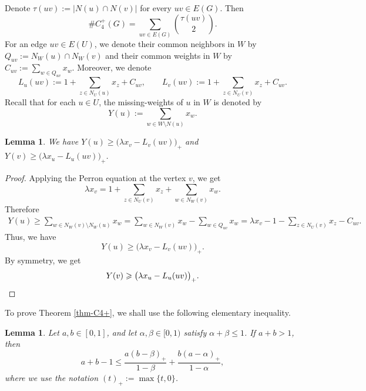\documentclass[10pt,a4paper]{amsart}
\newtheorem{lemma}[theorem]{Lemma}
\renewcommand{\le}{\leqslant}
\renewcommand{\ge}{\geqslant}
\begin{document}
\smallskip 
Denote $  \tau(uv):=|N(u)\cap N(v)|$ for every  $uv\in E(G)$. 
Then
\begin{equation}\label{eq:kite-book-count}
        \texttt{\#}{C_4^+}(G)=\sum_{uv\in E(G)}{\tau(uv)\choose 2}.
\end{equation}  
For an edge \(uv\in E(U)\), we denote their  common neighbors in $W$ by 
$ Q_{uv}:=N_W(u)\cap N_W(v)$ 
and their common weights in $W$ by 
$C_{uv}:=\sum_{w\in Q_{uv}}x_w$. 
Moreover, we denote 
\[
        L_u(uv):=1+\sum_{z\in N_U(u)}x_z +C_{uv},
        \qquad
        L_v(uv):=1+ \sum_{z\in N_U(v)}x_z +C_{uv}.
\]
Recall that for each $u\in U$, the missing-weights of $u$ in $W$ is denoted by 
$$ Y(u) :=\sum_{w\in W\setminus N(u)}x_w. $$ 

\begin{lemma} \label{lem:Yu-Yv-lower-weighted}
    We have $Y(u)\ge \bigl(\lambda x_v-L_v(uv)\bigr)_+$ and $Y(v)\ge \bigl(\lambda x_u-L_u(uv)\bigr)_+$. 
\end{lemma}

\begin{proof} 
Applying the Perron equation at the vertex \(v\), we get
\[
        \lambda x_v
        =
        1+\sum_{z\in N_U(v)}x_z+\sum_{w\in N_W(v)}x_w .
\]
Therefore
\[
\begin{aligned}
        Y(u)     
        \ge
        \sum_{w\in N_W(v)\setminus N_W(u)}x_w     =
        \sum_{w\in N_W(v)}x_w-\sum_{w\in Q_{uv}}x_w  =
        \lambda x_v-1- \sum_{z\in N_U(v)}x_z -C_{uv}.
\end{aligned}
\]
Thus, we have 
\begin{equation*}
        Y(u)\ge \bigl(\lambda x_v-L_v(uv)\bigr)_+.
\end{equation*}
By symmetry, we get 
\begin{equation*}
        Y(v)\ge \bigl(\lambda x_u-L_u(uv)\bigr)_+. \qedhere 
\end{equation*} 
\end{proof}

To prove Theorem \ref{thm-C4+}, 
we shall use the following elementary inequality.

\begin{lemma}\label{lem:kite-algebra}
Let \(a,b\in[0,1]\), and let \(\alpha,\beta\in[0,1)\) satisfy
\(\alpha+\beta\le1\).  If \(a+b>1\), then
\[
        a+b-1
        \le
        \frac{a(b-\beta)_+}{1-\beta}
        +
        \frac{b(a-\alpha)_+}{1-\alpha},
\]
where we use the notation \((t)_+:=\max\{t,0\}\).
\end{lemma}
\end{document}

